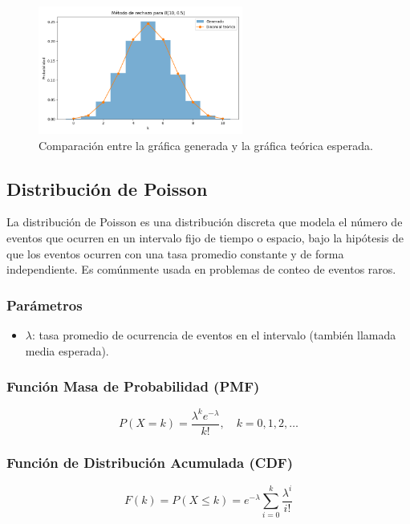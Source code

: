 \documentclass{article}
\begin{document}
\begin{figure}[H]
    \centering
    \includegraphics[width=0.6\textwidth]{visualizaciones/binomial_rechazo.png}
    \caption{Comparación entre la gráfica generada y la gráfica teórica esperada.}
    \label{fig:binomial_rechazo}
\end{figure}

\subsection{Distribución de Poisson}

La distribución de Poisson es una distribución discreta que modela el número de eventos que ocurren en un intervalo fijo de tiempo o espacio, bajo la hipótesis de que los eventos ocurren con una tasa promedio constante y de forma independiente. Es comúnmente usada en problemas de conteo de eventos raros.

\subsubsection*{Parámetros}
\begin{itemize}
  \item $\lambda$: tasa promedio de ocurrencia de eventos en el intervalo (también llamada media esperada).
\end{itemize}

\subsubsection*{Función Masa de Probabilidad (PMF)}
\[
P(X = k) = \frac{\lambda^k e^{-\lambda}}{k!}, \quad k = 0, 1, 2, \ldots
\]

\subsubsection*{Función de Distribución Acumulada (CDF)}
\[
F(k) = P(X \leq k) = e^{-\lambda} \sum_{i=0}^k \frac{\lambda^i}{i!}
\]
\end{document}
